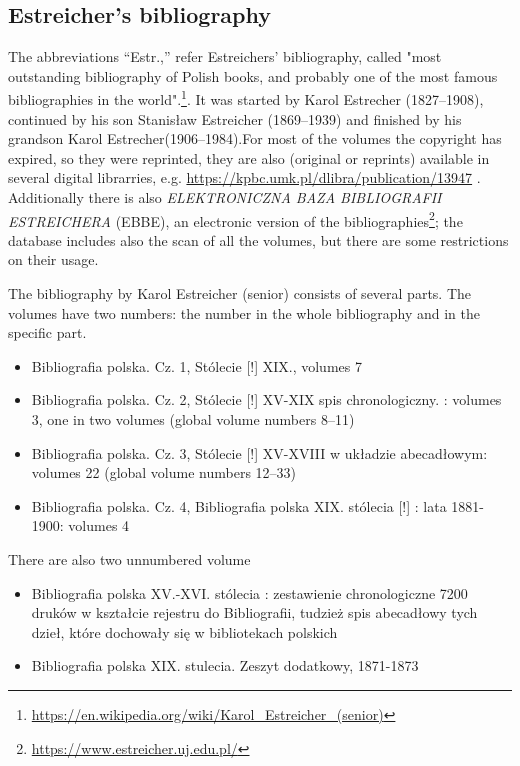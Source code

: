 \documentclass[12pt]{article}
\begin{document}
\subsection{Estreicher's bibliography}
\label{sec:estr-bibl}

The abbreviations ``Estr.,'' refer Estreichers' bibliography, called
"most outstanding bibliography of Polish books, and probably one of
the most famous bibliographies in the
world".\footnote{\url{https://en.wikipedia.org/wiki/Karol_Estreicher_(senior)}}. It
was started by Karol Estrecher (1827--1908), continued by his son
Stanisław Estreicher (1869--1939) and finished by his grandson Karol
Estrecher(1906--1984).For most of the volumes the copyright has
expired, so they were reprinted, they are also (original or reprints)
available in several digital librarries,
e.g. \url{https://kpbc.umk.pl/dlibra/publication/13947} .
Additionally there is also \textit{ELEKTRONICZNA BAZA BIBLIOGRAFII
  ESTREICHERA} (EBBE), an electronic version of the
bibliographies\footnote{\url{https://www.estreicher.uj.edu.pl/}}; the
database includes also the scan of all the volumes, but there are some
restrictions on their usage.

The bibliography by Karol Estreicher (senior) consists of several
parts. The volumes have two numbers: the number in the whole
bibliography and in the specific part.
  \begin{itemize}
  \item Bibliografia polska. Cz. 1, Stólecie [!] XIX., volumes 7
  \item 
    Bibliografia polska. Cz. 2, Stólecie [!] XV-XIX spis chronologiczny. : volumes 3, one in
    two volumes (global volume numbers 8--11)
      \item 
    Bibliografia polska. Cz. 3, Stólecie [!] XV-XVIII w układzie
    abecadłowym: volumes 22 (global volume numbers 12--33)
  \item 
    Bibliografia polska. Cz. 4, Bibliografia polska XIX. stólecia [!] :
    lata 1881-1900: volumes 4
  \end{itemize}
  There are  also two unnumbered volume
  \begin{itemize}
  \item Bibliografia polska XV.-XVI. stólecia : zestawienie chronologiczne
    7200 druków w kształcie rejestru do Bibliografii, tudzież spis
    abecadłowy tych dzieł, które dochowały się w bibliotekach polskich
  \item 
    Bibliografia polska XIX. stulecia. Zeszyt dodatkowy, 1871-1873
  \end{itemize}
\end{document}
